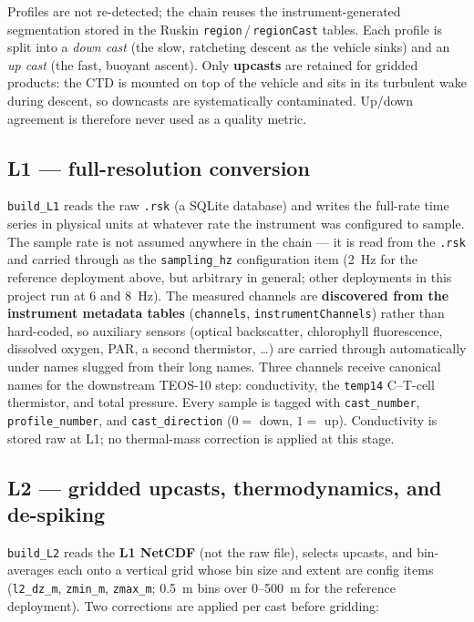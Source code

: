 \documentclass[11pt]{article}
\newcommand{\code}[1]{\texttt{#1}}
\begin{document}
Profiles are not re-detected; the chain reuses the instrument-generated segmentation stored
in the Ruskin \code{region}\,/\,\code{regionCast} tables. Each profile is split into a
\emph{down cast} (the slow, ratcheting descent as the vehicle sinks) and an \emph{up cast}
(the fast, buoyant ascent). Only \textbf{upcasts} are retained for gridded products: the CTD
is mounted on top of the vehicle and sits in its turbulent wake during descent, so downcasts
are systematically contaminated. Up/down agreement is therefore never used as a quality
metric.

\subsection{L1 --- full-resolution conversion}

\code{build\_L1} reads the raw \code{.rsk} (a SQLite database) and writes the full-rate time
series in physical units at whatever rate the instrument was configured to sample. The
sample rate is not assumed anywhere in the chain --- it is read from the \code{.rsk} and
carried through as the \code{sampling\_hz} configuration item (2~Hz for the reference
deployment above, but arbitrary in general; other deployments in this project run at 6 and
8~Hz). The measured channels are \textbf{discovered from the
instrument metadata tables} (\code{channels}, \code{instrumentChannels}) rather than
hard-coded, so auxiliary sensors (optical backscatter, chlorophyll fluorescence, dissolved
oxygen, PAR, a second thermistor, \dots) are carried through automatically under names
slugged from their long names. Three channels receive canonical names for the downstream
TEOS-10 step: conductivity, the \code{temp14} C--T-cell thermistor, and total pressure. Every
sample is tagged with \code{cast\_number}, \code{profile\_number}, and \code{cast\_direction}
($0=$ down, $1=$ up). Conductivity is stored raw at L1; no thermal-mass correction is applied
at this stage.

\subsection{L2 --- gridded upcasts, thermodynamics, and de-spiking}

\code{build\_L2} reads the \textbf{L1 NetCDF} (not the raw file), selects upcasts, and
bin-averages each onto a vertical grid whose bin size and extent are config items
(\code{l2\_dz\_m}, \code{zmin\_m}, \code{zmax\_m}; 0.5~m bins over 0--500~m for the reference
deployment). Two corrections are
applied per cast before gridding:
\end{document}

